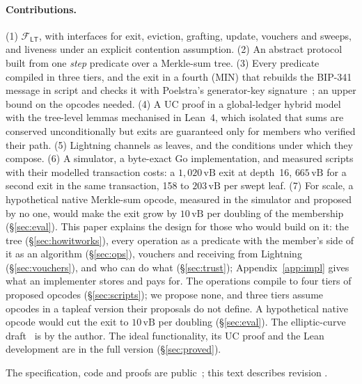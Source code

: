 \documentclass[runningheads]{llncs}
\newif\ifanon
\newif\iffullversion
\newcommand{\vB}{\,\mathrm{vB}}
\newcommand{\Ftree}{\ensuremath{\mathcal{F}_{\mathsf{LT}}}}
\begin{document}
\paragraph{Contributions.} (1) $\Ftree$, with interfaces for exit,
eviction, grafting, update, vouchers and sweeps, and liveness under an
explicit contention assumption. (2) An abstract protocol built from one
\emph{step} predicate over a Merkle-sum tree. (3) Every predicate
compiled in three tiers, and the exit in a fourth (MIN) that rebuilds
the BIP-341 message in script and checks it with Poelstra's generator-key
signature~\cite{catschnorr}; an upper bound on the opcodes needed. (4) A
UC proof in a global-ledger hybrid model with the tree-level lemmas
mechanised in Lean~4, which isolated that sums are conserved
unconditionally but exits are guaranteed only for members who verified
their path. (5) Lightning channels as leaves, and the conditions under
which they compose. (6) A simulator, a byte-exact Go implementation, and
measured scripts with their modelled transaction costs: a $1{,}020\vB$ exit at depth~16, $665\vB$ for a second
exit in the same transaction, 158 to $203\vB$ per swept leaf. (7) For scale, a hypothetical native Merkle-sum
opcode, measured in the simulator and proposed by no one, would make the exit grow
by $10\vB$ per doubling of the membership (\S\ref{sec:eval}).
\else
This paper explains the design for those who would build on it: the
tree (\S\ref{sec:howitworks}), every operation as a predicate with the
member's side of it as an algorithm (\S\ref{sec:ops}), vouchers and
receiving from Lightning (\S\ref{sec:vouchers}), and who can do what
(\S\ref{sec:trust}); Appendix~\ref{app:impl} gives what an implementer
stores and pays for. The operations compile to four tiers of proposed
opcodes (\S\ref{sec:scripts}); we propose none, and three tiers assume
opcodes in a tapleaf version their proposals do not define. A hypothetical native opcode would cut the exit to $10\vB$ per doubling (\S\ref{sec:eval}).\ifanon\else{} The elliptic-curve
draft~\cite{ecops} is by the author.\fi{} The ideal functionality, its
UC proof and the Lean development are in the full version
(\S\ref{sec:proved}).
\fi
\ifanon
The specification, code and proofs are provided as an anonymised artefact.
\else
The specification, code and proofs are public~\cite{layertreerepo}; this
text describes revision \GitHash.
\fi

\iffullversion
\paragraph{This version.} A short version for developers walks through
the operations, vouchers and trust model and only states what is proved.
This full version is built around $\Ftree$: it carries the UC proof
(\S\ref{app:uc}) and the channel-leaf scripts (\S\ref{app:channels}),
the Lean statements inline, sections on costs against the alternatives
(\S\ref{sec:cost}), the node format and radix (\S\ref{sec:profiles}), batch
shapes (\S\ref{sec:batching}), grafting (\S\ref{sec:graft}) and
receiving over Lightning (\S\ref{sec:receive}), and the Lean
development and script listings (Appendices~\ref{app:lean}
and~\ref{app:listings}).
\fi
\end{document}
